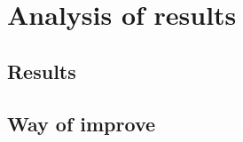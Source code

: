 
\chapter{Analysis of results}
\label{chap:analysis}


\section{Results}



\section{Way of improve}





